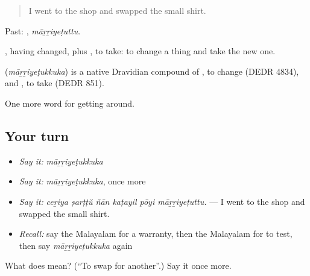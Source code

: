 \begin{quote}
I went to the shop and swapped the small shirt.
\end{quote}

Past: , \emph{māṟṟiyeṭuttu}.

, having changed, plus , to take: to change a thing and take the new one.

\begin{cousinweb}
\textbf{} (\emph{māṟṟiyeṭukkuka}) is a native Dravidian compound of , to change (DEDR 4834), and , to take (DEDR 851).
\end{cousinweb}

\begin{grammarlens}[title={What you've built}]
One more word for getting around.
\end{grammarlens}

\subsection*{Your turn}
\begin{itemize}
\raggedright
  \item \emph{Say it:} \emph{māṟṟiyeṭukkuka}
  \item \emph{Say it:} \emph{māṟṟiyeṭukkuka}, once more
  \item \emph{Say it:} \emph{ceṟiya ṣarṭṭŭ ñān kaṭayil pōyi māṟṟiyeṭuttu.} — I went to the shop and swapped the small shirt.
  \item \emph{Recall:} say the Malayalam for a warranty, then the Malayalam for to test, then say \emph{māṟṟiyeṭukkuka} again
\end{itemize}

\begin{tcolorbox}[breakable,colback=teal!4,colframe=teal!35!black,title={Before you move on}]
What does  mean? (\textquotedblleft{}To swap for another\textquotedblright{}.) Say it once more.
\end{tcolorbox}
